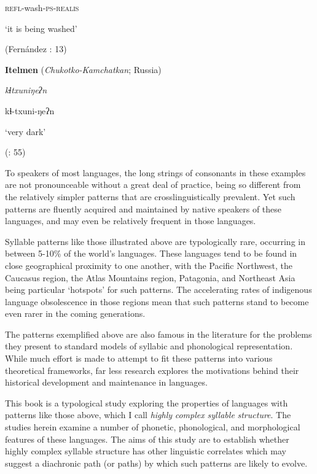 \textsc{refl}{}-wash-\textsc{ps-realis}

‘it is being washed’

(Fernández \citealt{GarayHernández2006}: 13)

\z

\ea\label{ex:(1.5)}
   \textbf{Itelmen} (\textit{Chukotko-Kamchatkan}; Russia)

\textit{kɬtxuniŋeʔn}

kɬ{}-txuni{}-ŋeʔn

‘very dark’

(\citealt{GeorgVolodin1999}: 55)

\z

To speakers of most languages, the long strings of consonants in these examples are not pronounceable without a great deal of practice, being so different from the relatively simpler patterns that are crosslinguistically prevalent. Yet such patterns are fluently acquired and maintained by native speakers of these languages, and may even be relatively frequent in those languages.

  Syllable patterns like those illustrated above are typologically rare, occurring in between 5-10\% of the world’s languages. These languages tend to be found in close geographical proximity to one another, with the Pacific Northwest, the Caucasus region, the Atlas Mountains region, Patagonia, and Northeast Asia being particular ‘hotspots’ for such patterns. The accelerating rates of indigenous language obsolescence in those regions mean that such patterns stand to become even rarer in the coming generations.

  The patterns exemplified above are also famous in the literature for the problems they present to standard models of syllabic and phonological representation. While much effort is made to attempt to fit these patterns into various theoretical frameworks, far less research explores the motivations behind their historical development and maintenance in languages.

  This book is a typological study exploring the properties of languages with patterns like those above, which I call \textit{highly} \textit{complex} \textit{syllable} \textit{structure}. The studies herein examine a number of phonetic, phonological, and morphological features of these languages. The aims of this study are to establish whether highly complex syllable structure has other linguistic correlates which may suggest a diachronic path (or paths) by which such patterns are likely to evolve.

